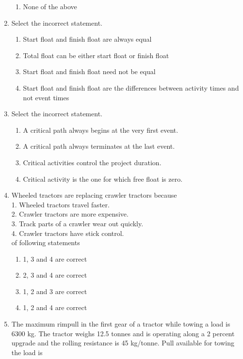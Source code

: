 \documentclass[11pt,a4paper]{article}
\begin{document}
\begin{enumerate}
\begin{enumerate}[label=\Alph*.]
\item{None of the above}
\end{enumerate}
\item{Select the incorrect statement.}
\begin{enumerate}[label=\Alph*.]
\item{Start float and finish float are always equal}
\item{Total float can be either start float or finish float}
\item{Start float and finish float need not be equal}
\item{Start float and finish float are the differences between activity times and not event times}
\end{enumerate}
\item{Select the incorrect statement.}
\begin{enumerate}[label=\Alph*.]
\item{A critical path always begins at the very first event.}
\item{A critical path always terminates at the last event.}
\item{Critical activities control the project duration.}
\item{Critical activity is the one for which free float is zero.}
\end{enumerate}
\item{Wheeled tractors are replacing crawler tractors because \\
 1. Wheeled tractors travel faster. \\
 2. Crawler tractors are more expensive. \\
 3. Track parts of a crawler wear out quickly. \\
 4. Crawler tractors have stick control. \\
 of following statements
}
\begin{enumerate}[label=\Alph*.]
\item{1, 3 and 4 are correct}
\item{2, 3 and 4 are correct}
\item{1, 2 and 3 are correct}
\item{1, 2 and 4 are correct}
\end{enumerate}
\item{The maximum rimpull in the first gear of a tractor while towing a load is 6300 kg. The tractor weighs 12.5 tonnes and is operating along a 2 percent upgrade and the rolling resistance is 45 kg/tonne. Pull available for towing the load is}
\\\begin{enumerate*}[itemjoin=\qquad, label=\Alph*.]

\end{enumerate*}
\end{enumerate}
\end{document}
